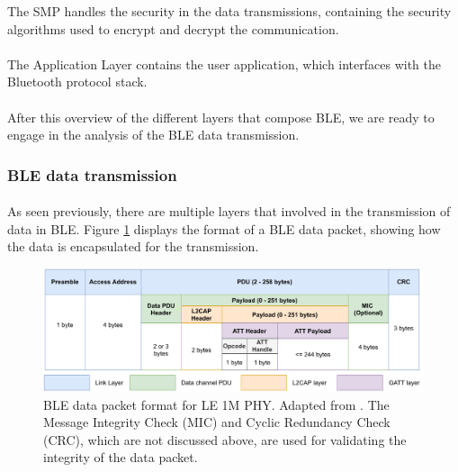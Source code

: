 The \acf{SMP} handles the security in the data transmissions, containing the security algorithms used to encrypt and decrypt the communication.

\paragraph{} The Application Layer contains the user application, which interfaces with the Bluetooth protocol stack.


\paragraph{} After this overview of the different layers that compose \acs{BLE}, we are ready to engage in the analysis of the \acs{BLE} data transmission.

\subsubsection{\acs{BLE} data transmission}

\paragraph{} As seen previously, there are multiple layers that involved in the transmission of data in \acs{BLE}. Figure \ref{fig:ble-ll-packet-format} displays the format of a \acs{BLE} data packet, showing how the data is encapsulated for the transmission.

\begin{figure}[H]
    \centering
    \includegraphics[width=\linewidth]{images/bluetooth data packet format.pdf}
    \caption[Diagram of the \acs{BLE} data packet format for LE 1M \acs{PHY}.]{\acs{BLE} data packet format for LE 1M \acs{PHY}. Adapted from \cite{Specification1999, Farej2020}. The Message Integrity Check (MIC) and Cyclic Redundancy Check (CRC), which are not discussed above, are used for validating the integrity of the data packet.}
    \label{fig:ble-ll-packet-format}
\end{figure}

